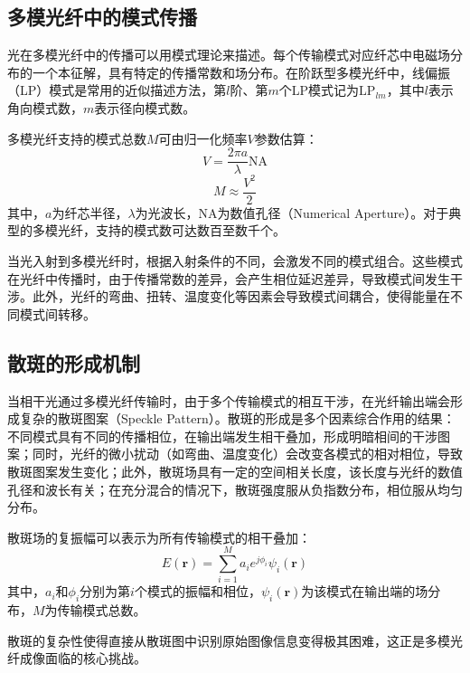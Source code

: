 {\subsection{多模光纤中的模式传播}

光在多模光纤中的传播可以用模式理论来描述。每个传输模式对应纤芯中电磁场分布的一个本征解，具有特定的传播常数和场分布。在阶跃型多模光纤中，线偏振（LP）模式是常用的近似描述方法，第$l$阶、第$m$个LP模式记为$\text{LP}_{lm}$，其中$l$表示角向模式数，$m$表示径向模式数。

多模光纤支持的模式总数$M$可由归一化频率$V$参数估算\citep{snyder1983optical}：
\begin{equation}\label{eq:V_parameter}
V = \frac{2\pi a}{\lambda} \text{NA}
\end{equation}
\begin{equation}\label{eq:mode_number}
M \approx \frac{V^2}{2}
\end{equation}
其中，$a$为纤芯半径，$\lambda$为光波长，NA为数值孔径（Numerical Aperture）。对于典型的多模光纤，支持的模式数可达数百至数千个。

当光入射到多模光纤时，根据入射条件的不同，会激发不同的模式组合。这些模式在光纤中传播时，由于传播常数的差异，会产生相位延迟差异，导致模式间发生干涉。此外，光纤的弯曲、扭转、温度变化等因素会导致模式间耦合，使得能量在不同模式间转移。

\subsection{散斑的形成机制}

当相干光通过多模光纤传输时，由于多个传输模式的相互干涉，在光纤输出端会形成复杂的散斑图案（Speckle Pattern）。散斑的形成是多个因素综合作用的结果：不同模式具有不同的传播相位，在输出端发生相干叠加，形成明暗相间的干涉图案；同时，光纤的微小扰动（如弯曲、温度变化）会改变各模式的相对相位，导致散斑图案发生变化；此外，散斑场具有一定的空间相关长度，该长度与光纤的数值孔径和波长有关；在充分混合的情况下，散斑强度服从负指数分布，相位服从均匀分布。

散斑场的复振幅可以表示为所有传输模式的相干叠加\citep{goodman2020speckle}：
\begin{equation}
E(\mathbf{r}) = \sum_{i=1}^{M} a_i e^{j\phi_i} \psi_i(\mathbf{r})
\end{equation}
其中，$a_i$和$\phi_i$分别为第$i$个模式的振幅和相位，$\psi_i(\mathbf{r})$为该模式在输出端的场分布，$M$为传输模式总数。

散斑的复杂性使得直接从散斑图中识别原始图像信息变得极其困难，这正是多模光纤成像面临的核心挑战。

}

